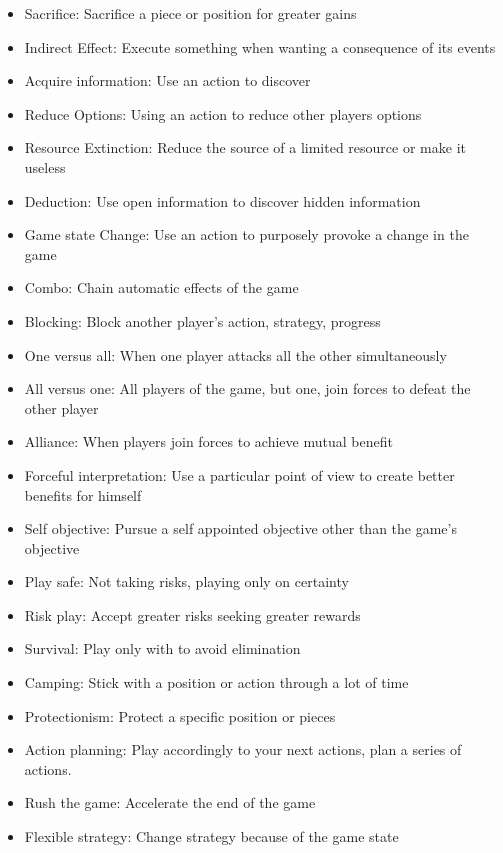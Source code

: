 \begin{multicols}{2}
    
\begin{itemize}
    \item Sacrifice: Sacrifice a piece or position for greater gains
    \item Indirect Effect: Execute something when wanting a consequence of its events
    \item Acquire information: Use an action to discover 
    \item Reduce Options: Using an action to reduce other players options
    \item Resource Extinction: Reduce the source of a limited resource or make it useless
    \item Deduction: Use open information to discover hidden information
    \item Game state Change: Use an action to purposely provoke a change in the game
    \item Combo: Chain automatic effects of the game
    \item Blocking: Block another player's action, strategy, progress
    \item One versus all: When one player attacks all the other simultaneously 
    \item All versus one: All players of the game, but one, join forces to defeat the other player
    \item Alliance: When players join forces to achieve mutual benefit
    \item Forceful interpretation: Use a particular point of view to create better benefits for himself
    \item Self objective: Pursue a self appointed objective other than the game's objective
    \item Play safe: Not taking risks, playing only on certainty
    \item Risk play: Accept greater risks seeking greater rewards
    \item Survival: Play only with to avoid elimination
    \item Camping: Stick with a position or action through a lot of time
    \item Protectionism: Protect a specific position or pieces
    \item Action planning: Play accordingly to your next actions, plan a series of actions.
    \item Rush the game: Accelerate the end of the game
    \item Flexible strategy: Change strategy because of the game state

\end{itemize}
\end{multicols}
